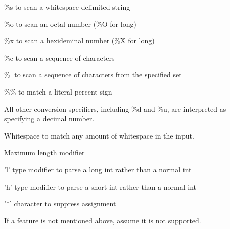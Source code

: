 \begin{DoxyItemize}
\item {\ttfamily \%s} to scan a whitespace-\/delimited string
\item {\ttfamily \%o} to scan an octal number ({\ttfamily \%O} for long)
\item {\ttfamily \%x} to scan a hexideminal number ({\ttfamily \%X} for long)
\item {\ttfamily \%c} to scan a sequence of characters
\item {\ttfamily \%}\mbox{[} to scan a sequence of characters from the specified set
\item {\ttfamily \%\%} to match a literal percent sign
\item All other conversion specifiers, including {\ttfamily \%d} and {\ttfamily \%u}, are interpreted as specifying a decimal number.
\item Whitespace to match any amount of whitespace in the input.
\item Maximum length modifier
\item {\ttfamily 'l'} type modifier to parse a long int rather than a normal int
\item {\ttfamily 'h'} type modifier to parse a short int rather than a normal int
\item {\ttfamily '$\ast$'} character to suppress assignment
\end{DoxyItemize}

If a feature is not mentioned above, assume it is not supported.


